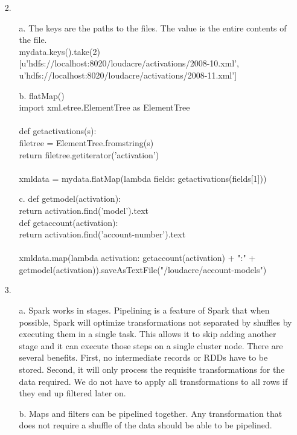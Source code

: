 \documentclass{article}
\begin{document}
\begin{itemize}
\pagebreak
\setlength{\headsep}{5pt}
\item[2.]
	\begin{itemize}
		\item[a.] The keys are the paths to the files. The value is the entire contents of the file.\\
				mydata.keys().take(2)\\
				{[u'hdfs://localhost:8020/loudacre/activations/2008-10.xml',\\
 				u'hdfs://localhost:8020/loudacre/activations/2008-11.xml']}
		\item[b.] flatMap()\\
				import xml.etree.ElementTree as ElementTree\\
				\\
				def getactivations(s):\\
    				filetree = ElementTree.fromstring(s)\\
    				return filetree.getiterator('activation')\\
				\\
				xmldata = mydata.flatMap(lambda fields: getactivations(fields[1]))\\
		\item[c.]
				def getmodel(activation):\\
 					return activation.find('model').text\\
				def getaccount(activation):\\
      				return activation.find('account-number').text\\
      				\\
				xmldata.map(lambda activation: getaccount(activation) + ":" + getmodel(activation)).saveAsTextFile("/loudacre/account-models")

	\end{itemize}
	
\pagebreak
\vspace{2cm}
\item[3.]
	\begin{itemize}
		\item[a.] Spark works in stages. Pipelining is a feature of Spark that when possible, Spark will optimize transformations not separated by shuffles by executing them in a single task. This allows it to skip adding another stage and it can execute those steps on a single cluster node. There are several benefits. First, no intermediate records or RDDs have to be stored. Second, it will only process the requisite transformations for the data required. We do not have to apply all transformations to all rows if they end up filtered later on.
		\item[b.] Maps and filters can be pipelined together. Any transformation that does not require a shuffle of the data should be able to be pipelined.
	\end{itemize}

\end{itemize}
\end{document}
